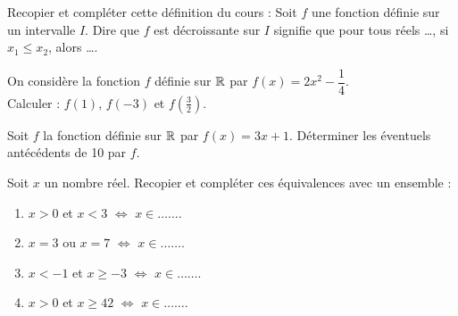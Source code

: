 \documentclass[a4paper,11pt,DIV15,BCOR0mm]{scrartcl}
\begin{document}
\begin{exercice}
Recopier et compléter cette définition du cours :
\og Soit $f$ une fonction définie sur un intervalle $I$.
Dire que $f$ est décroissante sur $I$ signifie que pour tous réels \dots, 
si $x_1\leqslant x_2$, alors \dots\fg.
\end{exercice}

\begin{exercice}
On considère la fonction $f$ définie sur $\mathbb{R}$ par $f(x)= 2x^2-\dfrac{1}{4}$.\\
Calculer :
$f(1)$, $f(-3)$ et $f\left(\frac{3}{2}\right)$.

\end{exercice}

\begin{exercice}
Soit $f$ la fonction définie sur $\mathbb{R}$
par $f(x)=3x+1$.
Déterminer les éventuels antécédents de 10 par $f$. 
\end{exercice}

\begin{exercice}
Soit $x$ un nombre réel.
Recopier et compléter ces équivalences avec un ensemble :
\begin{enumerate}
\item $x>0$ et $x<3$ $\Leftrightarrow$ $x\in\ldots\ldots$.
\item $x=3$ ou $x=7$ $\Leftrightarrow$ $x\in\ldots\ldots$.
\item $x<-1$ et $x\geqslant-3$ $\Leftrightarrow$ $x\in\ldots\ldots$.
\item $x>0$ et $x\geqslant 42$ $\Leftrightarrow$ $x\in\ldots\ldots$.
\end{enumerate}
\end{exercice}
\end{document}
